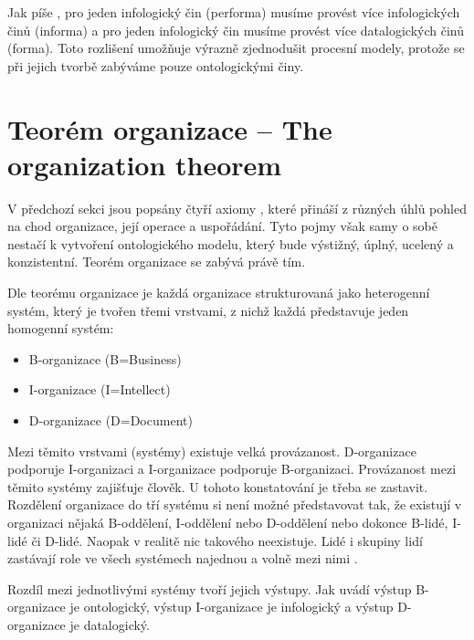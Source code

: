 Jak píše \cite{Vejrazkova2013}, pro jeden infologický čin (performa) musíme provést více infologických činů (informa) a pro jeden infologický čin musíme provést více datalogických činů (forma). Toto rozlišení umožňuje výrazně zjednodušit procesní modely, protože se při jejich tvorbě zabýváme pouze ontologickými činy.

\section{Teorém organizace – The organization theorem}

V předchozí sekci jsou popsány čtyří axiomy \ptheory{}, které přináší z různých úhlů pohled na chod organizace, její operace a uspořádání. Tyto pojmy však samy o sobě nestačí k vytvoření ontologického modelu, který bude výstižný, úplný, ucelený a konzistentní. Teorém organizace se zabývá právě tím.

Dle teorému organizace je každá organizace strukturovaná jako heterogenní systém, který je tvořen třemi vrstvami, z nichž každá představuje jeden homogenní systém: \cite{Dietz2006}

\begin{itemize}
\item B-organizace (B=Business)
\item I-organizace (I=Intellect)
\item D-organizace (D=Document)
\end{itemize}

Mezi těmito vrstvami (systémy) existuje velká provázanost. D-organizace podporuje I-organizaci a I-organizace podporuje B-organizaci. Provázanost mezi těmito systémy zajišťuje člověk. U tohoto konstatování je třeba se zastavit. Rozdělení organizace do tří systému si není možné představovat tak, že existují v organizaci nějaká B-oddělení, I-oddělení nebo D-oddělení nebo dokonce B-lidé, I-lidé či D-lidé. Naopak v realitě nic takového neexistuje. Lidé i skupiny lidí zastávají role ve všech systémech najednou a volně mezi nimi .

Rozdíl mezi jednotlivými systémy tvoří jejich výstupy. Jak uvádí \cite{Dietz2006} výstup B-organizace je ontologický, výstup I-organizace je infologický a výstup D-organizace je datalogický.

